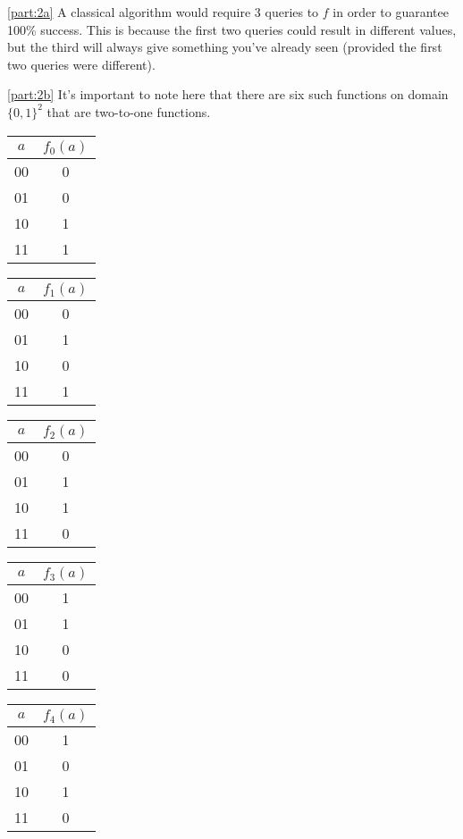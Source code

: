 \documentclass[boxes,pages]{homework}
\begin{document}
\begin{solution}
	\ref{part:2a}
	A classical algorithm would require 3 queries to $f$ in order to guarantee 100\% success. This is because the first two queries could result in different values, but the third will always give something you've already seen (provided the first two queries were different).

	\ref{part:2b}
	It's important to note here that there are six such functions on domain $\{0, 1\}^2$ that are two-to-one functions.
	\begin{center}
		\begin{tabular}{c | c}
			$a$ & $f_0(a)$ \\ \toprule
			00  & 0        \\
			01  & 0        \\
			10  & 1        \\
			11  & 1
		\end{tabular}
		\qquad
		\begin{tabular}{c | c}
			$a$ & $f_1(a)$ \\ \toprule
			00  & 0        \\
			01  & 1        \\
			10  & 0        \\
			11  & 1
		\end{tabular}
		\qquad
		\begin{tabular}{c | c}
			$a$ & $f_2(a)$ \\ \toprule
			00  & 0        \\
			01  & 1        \\
			10  & 1        \\
			11  & 0
		\end{tabular}
	\end{center}
	\begin{center}
		\begin{tabular}{c | c}
			$a$ & $f_3(a)$ \\ \toprule
			00  & 1        \\
			01  & 1        \\
			10  & 0        \\
			11  & 0
		\end{tabular}
		\qquad
		\begin{tabular}{c | c}
			$a$ & $f_4(a)$ \\ \toprule
			00  & 1        \\
			01  & 0        \\
			10  & 1        \\
			11  & 0
		\end{tabular}

\end{center}
\end{solution}
\end{document}
